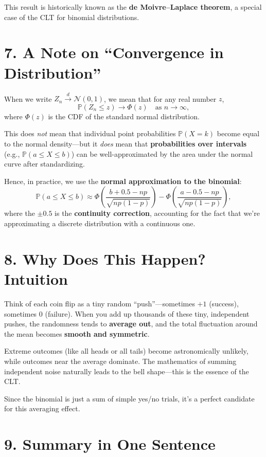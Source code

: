 \documentclass[12pt]{article}
\begin{document}
This result is historically known as the \textbf{de Moivre–Laplace theorem}, a special case of the CLT for binomial distributions.

\section*{7. A Note on ``Convergence in Distribution''}

When we write $Z_n \xrightarrow{d} \mathcal{N}(0,1)$, we mean that for any real number $z$,
\[
\mathbb{P}(Z_n \leq z) \longrightarrow \Phi(z) \quad \text{as } n \to \infty,
\]
where $\Phi(z)$ is the CDF of the standard normal distribution.

This does \textit{not} mean that individual point probabilities $\mathbb{P}(X = k)$ become equal to the normal density—but it \textit{does} mean that \textbf{probabilities over intervals} (e.g., $\mathbb{P}(a \leq X \leq b)$) can be well-approximated by the area under the normal curve after standardizing.

Hence, in practice, we use the \textbf{normal approximation to the binomial}:
\[
\mathbb{P}(a \leq X \leq b) \approx \Phi\!\left( \frac{b + 0.5 - np}{\sqrt{np(1 - p)}} \right) - \Phi\!\left( \frac{a - 0.5 - np}{\sqrt{np(1 - p)}} \right),
\]
where the $\pm 0.5$ is the \textbf{continuity correction}, accounting for the fact that we’re approximating a discrete distribution with a continuous one.

\section*{8. Why Does This Happen? Intuition}

Think of each coin flip as a tiny random ``push''—sometimes $+1$ (success), sometimes $0$ (failure). When you add up thousands of these tiny, independent pushes, the randomness tends to \textbf{average out}, and the total fluctuation around the mean becomes \textbf{smooth and symmetric}.

Extreme outcomes (like all heads or all tails) become astronomically unlikely, while outcomes near the average dominate. The mathematics of summing independent noise naturally leads to the bell shape—this is the essence of the CLT.

Since the binomial is just a sum of simple yes/no trials, it’s a perfect candidate for this averaging effect.

\section*{9. Summary in One Sentence}
\end{document}
